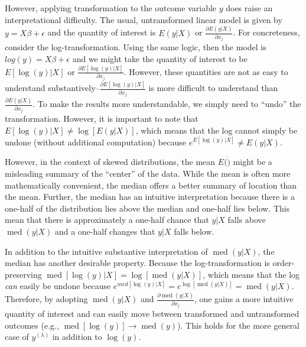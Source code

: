 \documentclass[10pt]{article}
\DeclareMathOperator{\med}{med}
\begin{document}
However, applying transformation to the outcome variable $y$ does raise an interpretational difficulty. The usual, untransformed linear model is given by $y = X\beta + \epsilon$ and the quantity of interest is $E(y | X)$ or $\frac{\partial E(y | X)}{\partial x_j}$. For concreteness, consider the log-transformation. Using the same logic, then the model is $log(y) = X\beta + \epsilon$ and we might take the quantity of interest to be $E[\log(y) | X]$ or $\frac{\partial E[\log(y) | X]}{\partial x_j}$. However, these quantities are not as easy to understand substantively--$\frac{\partial E[\log(y) | X]}{\partial x_j}$ is more difficult to understand than $\frac{\partial E(y | X)}{\partial x_j}$. To make the results more understandable, we simply need to ``undo'' the transformation. However, it is important to note that $E[\log(y) | X] \neq \log [E(y | X)]$, which means that the log cannot simply be undone (without additional computation) because $e^{E[\log(y) | X]} \neq E(y | X)$. 

However, in the context of skewed distributions, the mean $E(\dot)$ might be a misleading summary of the ``center'' of the data. While the mean is often more mathematically convenient, the median offers a better summary of location than the mean. Further, the median has an intuitive interpretation because there is a one-half of the distribution lies above the median and one-half lies below. This mean that there is approximately a one-half chance that $y |X$ falls above $\med(y | X)$ and a one-half changes that $y |X$ falls below.

In addition to the intuitive substantive interpretation of $\med(y | X)$, the median has another desirable property. Because the log-transformation is order-preserving $\med[\log(y) | X] = \log [\med(y | X)]$, which means that the log \textit{can} easily be undone because $e^{med[\log(y) | X]} = e^{\log[\med(y | X)]} = \med(y | X)$. Therefore, by adopting $\med(y | X)$ and $\frac{\partial \med(y | X)}{\partial x_j}$, one gains a more intuitive quantity of interest and can easily move between transformed and untransformed outcomes (e.g., $\med[\log(y)] \rightarrow \med(y)$). This holds for the more general case of $y^{(\lambda)}$ in addition to $\log(y)$.
\end{document}
